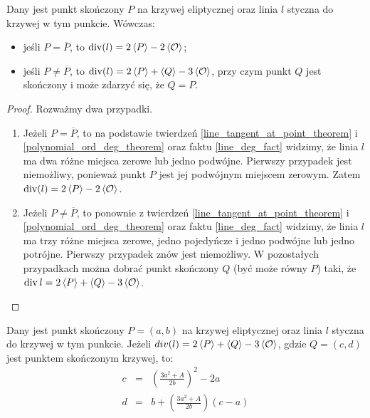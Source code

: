 \begin{theorem}
Dany jest punkt skończony $P$ na krzywej eliptycznej
oraz linia $l$ styczna do krzywej w tym punkcie.
Wówczas:
\begin{itemize}
\item jeśli $P = \overline{P}$,
to $\operatorname{div}(l) = 2\left\langle P\right\rangle - 2\left\langle\mathcal{O}\right\rangle$;
\item jeśli $P \neq \overline{P}$,
to $\operatorname{div}(l) = 2\left\langle P\right\rangle + \left\langle Q\right\rangle - 3\left\langle\mathcal{O}\right\rangle$,
przy czym punkt $Q$ jest skończony
i może zdarzyć się, że $Q = P$.
\end{itemize}
\end{theorem}

\begin{proof}
Rozważmy dwa przypadki.
\begin{enumerate}
\item
Jeżeli $P = \overline{P}$,
to na podstawie twierdzeń
\ref{line_tangent_at_point_theorem} i \ref{polynomial_ord_deg_theorem}
oraz faktu \ref{line_deg_fact} widzimy,
że linia $l$ ma dwa różne miejsca zerowe lub jedno podwójne.
Pierwszy przypadek jest niemożliwy,
ponieważ punkt $P$ jest jej podwójnym miejscem zerowym.
Zatem $\operatorname{div}(l) = 2\left\langle P\right\rangle - 2\left\langle\mathcal{O}\right\rangle$.
\item
Jeżeli $P \neq \overline{P}$,
to ponownie z twierdzeń
\ref{line_tangent_at_point_theorem} i \ref{polynomial_ord_deg_theorem}
oraz faktu \ref{line_deg_fact} widzimy,
że linia $l$ ma trzy różne miejsca zerowe, jedno pojedyńcze i jedno podwójne
lub jedno potrójne.
Pierwszy przypadek znów jest niemożliwy.
W pozostałych przypadkach można dobrać punkt skończony $Q$
(być może równy $P$) taki,
że $\operatorname{div}{l} = 2\left\langle P\right\rangle + \left\langle Q\right\rangle - 3\left\langle\mathcal{O}\right\rangle$.
\end{enumerate}
\end{proof}

\begin{theorem}
Dany jest punkt skończony $P = (a, b)$ na krzywej eliptycznej
oraz linia $l$ styczna do krzywej w tym punkcie.
Jeżeli $div(l) = 2\left\langle P\right\rangle + \left\langle Q\right\rangle - 3\left\langle\mathcal{O}\right\rangle$,
gdzie $Q = (c, d)$ jest punktem skończonym krzywej,
to:
\begin{eqnarray}
\label{tangent_line_third_point_x_eqn}
c & = & \left(\frac{3a^2 + A}{2b}\right)^2 - 2a \\
\label{tangent_line_third_point_y_eqn}
d & = & b + \left(\frac{3a^2 + A}{2b}\right)(c - a)
\end{eqnarray}
\end{theorem}

